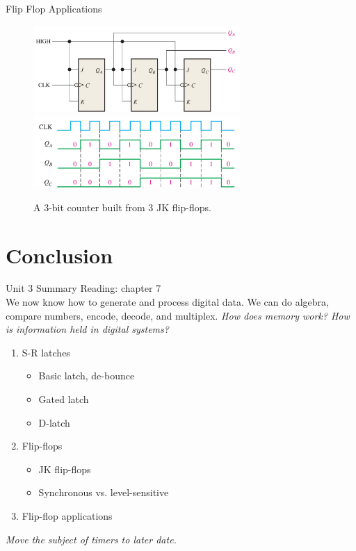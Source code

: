 \documentclass{beamer}
\begin{document}
\begin{frame}{Flip Flop Applications}
\begin{figure}
\centering
\includegraphics[width=0.7\textwidth]{figures/counter_1.jpg} \\ \vspace{0.5cm}
\includegraphics[width=0.7\textwidth]{figures/counter_2.jpg}
\caption{\label{fig:app3} A 3-bit counter built from 3 JK flip-flops.}
\end{figure}
\end{frame}

\section{Conclusion}

\begin{frame}{Unit 3 Summary}
\alert{Reading: chapter 7} \\
We now know how to generate and process digital data. We can do algebra, compare numbers, encode, decode, and multiplex.  \textit{How does memory work?  How is information held in digital systems?}
\begin{enumerate}
\item S-R latches
\begin{itemize}
\item Basic latch, de-bounce
\item Gated latch
\item D-latch
\end{itemize}
\item Flip-flops
\begin{itemize}
\item JK flip-flops
\item Synchronous vs. level-sensitive
\end{itemize}
\item Flip-flop applications
\end{enumerate}
\textit{Move the subject of timers to later date.}
\end{frame}
\end{document}
